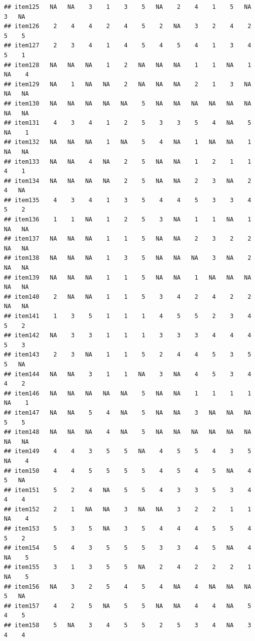 \documentclass[
  man]{apa6}
\begin{document}
\begin{verbatim}
## item125   NA   NA    3    1    3    5   NA    2    4    1    5   NA    3   NA
## item126    2    4    4    2    4    5    2   NA    3    2    4    2    5    5
## item127    2    3    4    1    4    5    4    5    4    1    3    4    5    1
## item128   NA   NA   NA    1    2   NA   NA   NA    1    1   NA    1   NA    4
## item129   NA    1   NA   NA    2   NA   NA   NA    2    1    3   NA   NA   NA
## item130   NA   NA   NA   NA   NA    5   NA   NA   NA   NA   NA   NA   NA   NA
## item131    4    3    4    1    2    5    3    3    5    4   NA    5   NA    1
## item132   NA   NA   NA    1   NA    5    4   NA    1   NA   NA    1   NA   NA
## item133   NA   NA    4   NA    2    5   NA   NA    1    2    1    1    4    1
## item134   NA   NA   NA   NA    2    5   NA   NA    2    3   NA    2    4   NA
## item135    4    3    4    1    3    5    4    4    5    3    3    4    5    2
## item136    1    1   NA    1    2    5    3   NA    1    1   NA    1   NA   NA
## item137   NA   NA   NA    1    1    5   NA   NA    2    3    2    2   NA   NA
## item138   NA   NA   NA    1    3    5   NA   NA   NA    3   NA    2   NA   NA
## item139   NA   NA   NA    1    1    5   NA   NA    1   NA   NA   NA   NA   NA
## item140    2   NA   NA    1    1    5    3    4    2    4    2    2   NA   NA
## item141    1    3    5    1    1    1    4    5    5    2    3    4    5    2
## item142   NA    3    3    1    1    1    3    3    3    4    4    4    5    3
## item143    2    3   NA    1    1    5    2    4    4    5    3    5    5   NA
## item144   NA   NA    3    1    1   NA    3   NA    4    5    3    4    4    2
## item146   NA   NA   NA   NA   NA    5   NA   NA    1    1    1    1   NA    1
## item147   NA   NA    5    4   NA    5   NA   NA    3   NA   NA   NA    5    5
## item148   NA   NA   NA    4   NA    5   NA   NA   NA   NA   NA   NA   NA   NA
## item149    4    4    3    5    5   NA    4    5    5    4    3    5   NA    4
## item150    4    4    5    5    5    5    4    5    4    5   NA    4    5   NA
## item151    5    2    4   NA    5    5    4    3    3    5    3    4    4    4
## item152    2    1   NA   NA    3   NA   NA    3    2    2    1    1   NA    4
## item153    5    3    5   NA    3    5    4    4    4    5    5    4    5    2
## item154    5    4    3    5    5    5    3    3    4    5   NA    4   NA    5
## item155    3    1    3    5    5   NA    2    4    2    2    2    1   NA    5
## item156   NA    3    2    5    4    5    4   NA    4   NA   NA   NA    5   NA
## item157    4    2    5   NA    5    5   NA   NA    4    4   NA    5    4    5
## item158    5   NA    3    4    5    5    2    5    3    4   NA    3    4    4

\end{verbatim}
\end{document}
